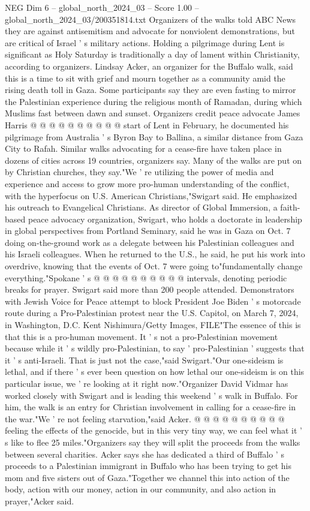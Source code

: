 \begin{textsample}{NEG Dim 6 – global\_north\_2024\_03 – Score 1.00 – global\_north\_2024\_03/200351814.txt}
Organizers of the walks told ABC News they are against antisemitism and advocate for nonviolent demonstrations, but are critical of Israel ' s military actions.
Holding a pilgrimage during Lent is significant as Holy Saturday is traditionally a day of lament within Christianity, according to organizers.
Lindsay Acker, an organizer for the Buffalo walk, said this is a time to sit with grief and mourn together as a community amid the rising death toll in Gaza.
Some participants say they are even fasting to mirror the Palestinian experience during the religious month of Ramadan, during which Muslims fast between dawn and sunset.
Organizers credit peace advocate James Harris @ @ @ @ @ @ @ @ @ @ start of Lent in February, he documented his pilgrimage from Australia ' s Byron Bay to Ballina, a similar distance from Gaza City to Rafah.
Similar walks advocating for a cease-fire have taken place in dozens of cities across 19 countries, organizers say.
Many of the walks are put on by Christian churches, they say."We ' re utilizing the power of media and experience and access to grow more pro-human understanding of the conflict, with the hyperfocus on U.S.
American Christians,"Swigart said.
He emphasized his outreach to Evangelical Christians.
As director of Global Immersion, a faith-based peace advocacy organization, Swigart, who holds a doctorate in leadership in global perspectives from Portland Seminary, said he was in Gaza on Oct. 7 doing on-the-ground work as a delegate between his Palestinian colleagues and his Israeli colleagues.
When he returned to the U.S., he said, he put his work into overdrive, knowing that the events of Oct. 7 were going to"fundamentally change everything."Spokane ' s @ @ @ @ @ @ @ @ @ @ intervals, denoting periodic breaks for prayer.
Swigart said more than 200 people attended.
Demonstrators with Jewish Voice for Peace attempt to block President Joe Biden ' s motorcade route during a Pro-Palestinian protest near the U.S.
Capitol, on March 7, 2024, in Washington, D.C.
Kent Nishimura/Getty Images, FILE"The essence of this is that this is a pro-human movement.
It ' s not a pro-Palestinian movement because while it ' s wildly pro-Palestinian, to say ' pro-Palestinian ' suggests that it ' s anti-Israeli.
That is just not the case,"said Swigart."Our one-sideism is lethal, and if there ' s ever been question on how lethal our one-sideism is on this particular issue, we ' re looking at it right now."Organizer David Vidmar has worked closely with Swigart and is leading this weekend ' s walk in Buffalo.
For him, the walk is an entry for Christian involvement in calling for a cease-fire in the war."We ' re not feeling starvation,"said Acker. @ @ @ @ @ @ @ @ @ @ feeling the effects of the genocide, but in this very tiny way, we can feel what it ' s like to flee 25 miles."Organizers say they will split the proceeds from the walks between several charities.
Acker says she has dedicated a third of Buffalo ' s proceeds to a Palestinian immigrant in Buffalo who has been trying to get his mom and five sisters out of Gaza."Together we channel this into action of the body, action with our money, action in our community, and also action in prayer,"Acker said.

\end{textsample}
